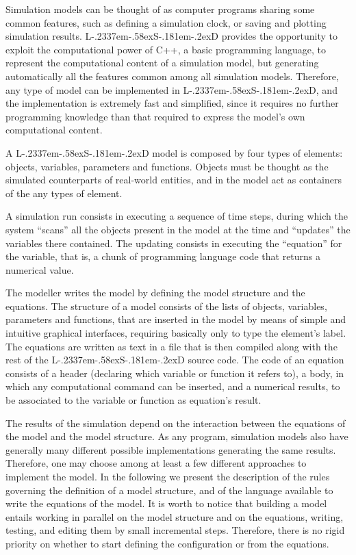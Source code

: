 \documentclass [11pt,a4paper] {book}
\def\LsD{{L\kern-.2337em\lower-.58ex\hbox{S}\kern-.181em\lower-.2ex\hbox{D}}\xspace}
\begin{document}
Simulation models can be thought of as computer programs sharing some common features, such as defining a simulation clock, or saving and plotting simulation results. \LsD provides the opportunity to exploit the computational power of C++, a basic programming language, to represent the computational content of a simulation model, but generating automatically all the features common among all simulation models. Therefore, any type of model can be implemented in \LsD, and the implementation is extremely fast and simplified, since it requires no further programming knowledge than that required to express the model's own computational content. 

A \LsD model is composed by four types of elements: objects, variables, parameters and functions. Objects must be thought as the simulated counterparts of real-world entities, and in the model act as containers of the any types of element. 

A simulation run consists in executing a sequence of time steps, during which the system ``scans'' all the objects present in the model at the time and ``updates'' the variables there contained. The updating consists in executing the ``equation'' for the variable, that is, a chunk of programming language code that returns a numerical value.

The modeller writes the model by defining the model structure and the equations. The structure of a model consists of the lists of objects, variables, parameters and functions, that are inserted in the model by means of simple and intuitive graphical interfaces, requiring basically only to type the element's label. The equations are written as text in a file that is then compiled along with the rest of the \LsD source code. The code of an equation consists of a header (declaring which variable or function it refers to), a body, in which any computational command can be inserted, and a numerical results, to be associated to the variable or function as equation's result.


The results of the simulation depend on the interaction between the equations of the model and the model structure. As any program, simulation models also have generally many different possible implementations generating the same results. Therefore, one may choose among at least a few different approaches to implement the model.  In the following we present the description of the rules governing the definition of a model structure, and of the language available to write the equations of the model. It is worth to notice that building a model entails working in parallel on the model structure and on the equations, writing, testing, and editing them by small incremental steps. Therefore, there is no rigid priority on whether to start defining the configuration or from the equations.
\end{document}
